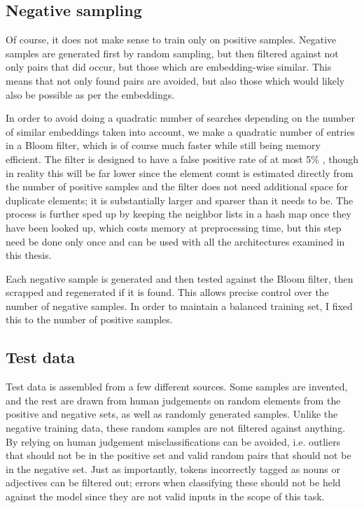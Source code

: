 \documentclass[a4paper, 12pt]{article}
\begin{document}
\subsection{Negative sampling}

Of course, it does not make sense to train only on positive samples. Negative samples are generated first by random sampling, but then filtered against not only pairs that did occur, but those which are embedding-wise similar. This means that not only found pairs are avoided, but also those which would likely also be possible as per the embeddings.

In order to avoid doing a quadratic number of searches depending on the number of similar embeddings taken into account, we make a quadratic number of entries in a Bloom filter, which is of course much faster while still being memory efficient. The filter is designed to have a false positive rate of at most 5\% , though in reality this will be far lower since the element count is estimated directly from the number of positive samples and the filter does not need additional space for duplicate elements; it is substantially larger and sparser than it needs to be. The process is further sped up by keeping the neighbor lists in a hash map once they have been looked up, which costs memory at preprocessing time, but this step need be done only once and can be used with all the architectures examined in this thesis.

Each negative sample is generated and then tested against the Bloom filter, then scrapped and regenerated if it is found. This allows precise control over the number of negative samples. In order to maintain a balanced training set, I fixed this to the number of positive samples.

\subsection{Test data}

Test data is assembled from a few different sources. Some samples are invented, and the rest are drawn from human judgements on random elements from the positive and negative sets, as well as randomly generated samples. Unlike the negative training data, these random samples are not filtered against anything. By relying on human judgement misclassifications can be avoided, i.e. outliers that should not be in the positive set and valid random pairs that should not be in the negative set. Just as importantly, tokens incorrectly tagged as nouns or adjectives can be filtered out; errors when classifying these should not be held against the model since they are not valid inputs in the scope of this task.
\end{document}
